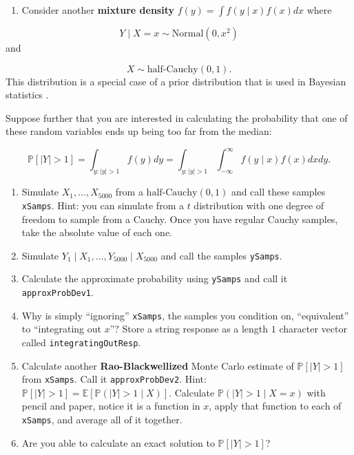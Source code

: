 \documentclass[
  12pt,
]{krantz}
\providecommand{\tightlist}{%
  \setlength{\itemsep}{0pt}\setlength{\parskip}{0pt}}
\begin{document}
\begin{enumerate}
\def\labelenumi{\arabic{enumi}.}
\setcounter{enumi}{2}
\tightlist
\item
  Consider another \textbf{mixture density} \(f(y) = \int f(y \mid x) f(x) dx\) where
\end{enumerate}

\[
Y \mid X = x \sim \text{Normal}(0, x^2)
\]
and

\[
X \sim \text{half-Cauchy}(0, 1).
\]
This distribution is a special case of a prior distribution that is used in Bayesian statistics \citep{horseshoe}.

Suppose further that you are interested in calculating the probability that one of these random variables ends up being too far from the median:

\[
\mathbb{P}[|Y| > 1] = \int_{y : |y| > 1} f(y)dy = \int_{y : |y| > 1} \int_{-\infty}^\infty  f(y \mid x) f(x) dx dy.
\]

\begin{enumerate}
\def\labelenumi{\alph{enumi}.}
\item
  Simulate \(X_1, \ldots, X_{5000}\) from a \(\text{half-Cauchy}(0, 1)\) and call these samples \texttt{xSamps}. Hint: you can simulate from a \(t\) distribution with one degree of freedom to sample from a Cauchy. Once you have regular Cauchy samples, take the absolute value of each one.
\item
  Simulate \(Y_1 \mid X_1, \ldots, Y_{5000} \mid X_{5000}\) and call the samples \texttt{ySamps}.
\item
  Calculate the approximate probability using \texttt{ySamps} and call it \texttt{approxProbDev1}.
\item
  Why is simply ``ignoring'' \texttt{xSamps}, the samples you condition on, ``equivalent'' to ``integrating out \(x\)''? Store a string response as a length \(1\) character vector called \texttt{integratingOutResp}.
\item
  Calculate another \textbf{Rao-Blackwellized} Monte Carlo estimate of \(\mathbb{P}[|Y| > 1]\) from \texttt{xSamps}. Call it \texttt{approxProbDev2}. Hint: \(\mathbb{P}[|Y| > 1] = \mathbb{E}[\mathbb{P}(|Y| > 1 \mid X) ]\). Calculate \(\mathbb{P}(|Y| > 1 \mid X=x)\) with pencil and paper, notice it is a function in \(x\), apply that function to each of \texttt{xSamps}, and average all of it together.
\item
  Are you able to calculate an exact solution to \(\mathbb{P}[|Y| > 1]\)?
\end{enumerate}
\end{document}
